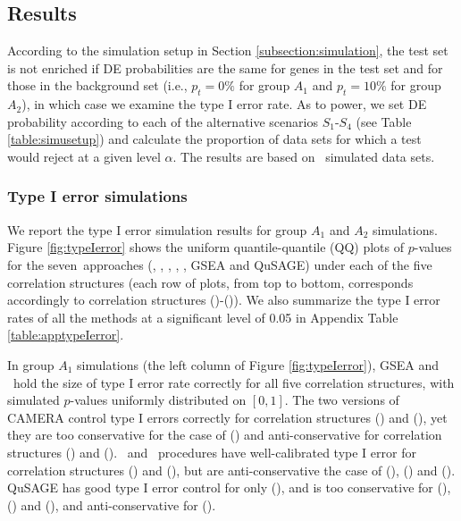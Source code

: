 	
	\subsection{Results}\label{section:results}
	
	According to the simulation setup in Section \ref{subsection:simulation}, the test set is not
	enriched if DE probabilities are the same for genes in the test set and for those in the 
	background set (i.e., $p_t =0\%$ for group $A_1$ and $p_t = 10\%$ for group $A_2$), in which 
	case we	examine the type I error rate. As to power, we set DE probability according to each of 
	the alternative scenarios $S_1$-$S_4$ (see Table \ref{table:simusetup}) and calculate the 
	proportion of data sets for which a test would reject at a given level $\alpha$. The results 
	are based on \HowmanySimu~simulated data sets. 
	
	
	
	\subsubsection{Type I error simulations}\label{subsection:typeIerror}
	
	
	We report the type I error simulation results for group $A_1$ and $A_2$ simulations. Figure
	\ref{fig:typeIerror} shows the uniform quantile-quantile (QQ) plots of $p$-values for the
	seven~approaches (\OurMethod, \gent, \genr, \CMT, \CMR, GSEA and QuSAGE) under each of the five
	correlation structures (each row of plots, from top to
	bottom, corresponds accordingly to correlation structures (\aaCase)-(\fCase)). We also 
	summarize the type I error rates of all the methods at a significant level of 0.05 in Appendix 
	Table \ref{table:apptypeIerror}.
	
	In group $A_1$ simulations (the left column of Figure \ref{fig:typeIerror}),  GSEA and
	\OurMethod~hold the size of type I error rate correctly for all five correlation structures, 
	with
	simulated $p$-values uniformly distributed on $[0, 1]$. The two versions of CAMERA control type 
	I
	errors correctly for correlation structures (\aaCase) and (\aCase), yet they are too 
	conservative
	for the case of (\cCase) and anti-conservative for correlation structures (\eCase) and (\fCase).
	\gent~and \genr~procedures have well-calibrated type I error for correlation structures 
	(\aaCase)
	and (\cCase), but are anti-conservative the case of (\aCase), (\eCase) and (\fCase). QuSAGE has 
	good
	type I error control for only (\aCase), and is too conservative for (\aaCase), (\eCase) and
	(\fCase), and anti-conservative for (\cCase).
	
